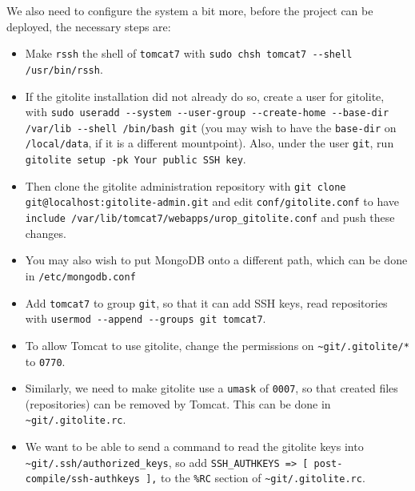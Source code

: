 \documentclass[12pt,a4paper]{article}
\newcommand{\gitoliteRc}{{\tt \~{}git/\hspace{0pt}.gitolite.rc}}
\newcommand{\gitoliteAuthkeys}{{\tt \~{}git/\hspace{0pt}.ssh/\hspace{0pt}authorized\_keys}}
\begin{document}
We also need to configure the system a bit more, before the project can be deployed, the necessary steps are:
\begin{itemize}
  \item Make {\tt rssh} the shell of {\tt tomcat7} with {\tt sudo chsh tomcat7 -{}-shell /usr/bin/rssh}.

  \item If the gitolite installation did not already do so, create a user for gitolite, with {\tt sudo useradd -{}-system -{}-user-group -{}-create-home -{}-base-dir /var/lib -{}-shell /bin/bash git} (you may wish to have the {\tt base-dir} on {\tt /local/data}, if it is a different mountpoint).
    Also, under the user {\tt git}, run {\tt gitolite setup -pk Your public SSH key}.

  \item Then clone the gitolite administration repository with {\tt git clone git@localhost:\hspace{0pt}gitolite-admin.git} and edit {\tt conf/gitolite.conf} to have {\tt include \textquotedbl{}/\hspace{0pt}var/\hspace{0pt}lib/\hspace{0pt}tomcat7/\hspace{0pt}webapps/\hspace{0pt}urop\_gitolite.conf\textquotedbl} and push these changes.

  \item You may also wish to put MongoDB onto a different path, which can be done in {\tt /etc/mongodb.conf}

  \item Add {\tt tomcat7} to group {\tt git}, so that it can add SSH keys, read repositories with {\tt usermod -{}-append -{}-groups git tomcat7}.

  \item To allow Tomcat to use gitolite, change the permissions on {\tt \~{}git/.gitolite/*} to {\tt 0770}.

  \item Similarly, we need to make gitolite use a {\tt umask} of {\tt 0007}, so that created files (repositories) can be removed by Tomcat.
    This can be done in \gitoliteRc{}.

  \item We want to be able to send a command to read the gitolite keys into \gitoliteAuthkeys{}, so add {\tt SSH\_AUTHKEYS => [ \textquotesingle{}post-compile/ssh-authkeys\textquotesingle{} ],} to the {\tt \%RC} section of \gitoliteRc{}.


\end{itemize}
\end{document}
